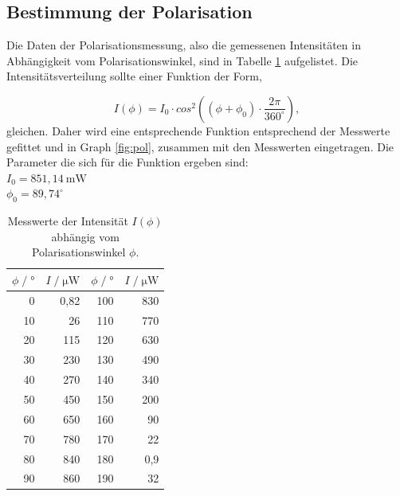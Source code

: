\subsection{Bestimmung der Polarisation}
\label{sec:bestimmung der Polarisation}
Die Daten der Polarisationsmessung, also die gemessenen Intensitäten in Abhängigkeit vom Polarisationswinkel, sind in Tabelle \ref{tab:pol} aufgelistet.
Die Intensitätsverteilung sollte einer Funktion der Form,

\begin{equation}
\label{equ:}
  I(\phi) = I_0 \cdot cos^2 \left((\phi + \phi_0) \cdot \frac{2 \pi}{360^{\circ}}\right),
\end{equation}
gleichen.
Daher wird eine entsprechende Funktion entsprechend der Messwerte gefittet und in Graph \ref{fig:pol}, zusammen mit den Messwerten eingetragen.
Die Parameter die sich für die Funktion ergeben sind: \\
$I_0 = 851,14 \: \si{\milli\watt}$ \\
$\phi_0 = 89,74^{\circ}$ 


\begin{table}[H]
  \centering
  \footnotesize
  \caption{Messwerte der Intensität $I(\phi)$ abhängig vom Polarisationswinkel $\phi$.}
  \label{tab:pol}
  \begin{tabular}{r r | r r}
  \toprule
  $\phi \;/\; \si{\degree}$ & $I \;/\; \si{\micro\watt}$  &  $\phi \;/\; \si{\degree}$ & $I \;/\; \si{\micro\watt}$\\
  \midrule
    0   & 0,82 &  100 & 830  \\
    10  & 26   &  110 & 770  \\
    20  & 115  &  120 & 630  \\
    30  & 230  &  130 & 490  \\
    40  & 270  &  140 & 340  \\
    50  & 450  &  150 & 200  \\
    60  & 650  &  160 & 90   \\
    70  & 780  &  170 & 22   \\
    80  & 840  &  180 & 0,9  \\
    90  & 860  &  190 & 32   \\
  \bottomrule
  \end{tabular}
\end{table}


